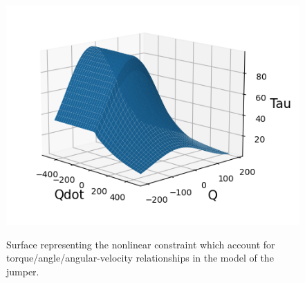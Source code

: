 \begin{figure}[h!]
\includegraphics[width=\columnwidth]{../figures/graph_force_vitesse_longueur.png}\\
\caption{Surface representing the nonlinear constraint which account for torque/angle/angular-velocity relationships in the model of the jumper.}
\label{fig:graph_force_vitesse_longueur}
\end{figure}
